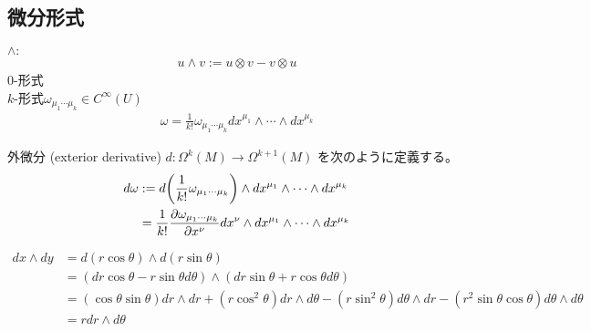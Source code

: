 \documentclass[uplatex,dvipdfmx,a4paper,11pt]{jlreq}
\theoremstyle{definition}
\begin{document}
\subsection{微分形式}
\begin{definition}[微分形式]
  $\land:$
  \begin{align}
    u\land v := u\otimes v - v\otimes u
  \end{align}
  $0$-形式 \\
  $k$-形式$\omega_{\mu_1\cdots\mu_k}\in C^\infty(U)$
  \begin{align}
    \omega = \frac{1}{k!}\omega_{\mu_1\cdots\mu_k}dx^{\mu_1}\land\cdots\land dx^{\mu_k}
  \end{align}
\end{definition}
\begin{definition}[外微分]
  外微分 (exterior derivative) $d: \Omega^k(M)\to\Omega^{k+1}(M)$ を次のように定義する。
  \begin{align}
    d\omega & := d\qty(\frac{1}{k!}\omega_{\mu_1\cdots\mu_k})\land dx^{\mu_1}\land\cdots\land dx^{\mu_k}                \\
            & = \frac{1}{k!}\pdv{\omega_{\mu_1\cdots\mu_k}}{x^{\nu}}dx^{\nu}\land dx^{\mu_1}\land\cdots\land dx^{\mu_k}
  \end{align}
\end{definition}
\begin{align}
  dx\land dy & = d(r\cos\theta)\land d(r\sin\theta)                                                                                                                  \\
             & = (dr\cos\theta - r\sin\theta d\theta)\land (dr\sin\theta + r\cos\theta d\theta)                                                                      \\
             & = (\cos\theta\sin\theta)dr\land dr + (r\cos^2\theta)dr\land d\theta - (r\sin^2\theta) d\theta\land dr - (r^2\sin\theta\cos\theta)d\theta\land d\theta \\
             & = r dr\land d\theta
\end{align}

\begin{definition}
\end{definition}

\begin{theorem}[ストークスの定理]
\end{theorem}
\end{document}
